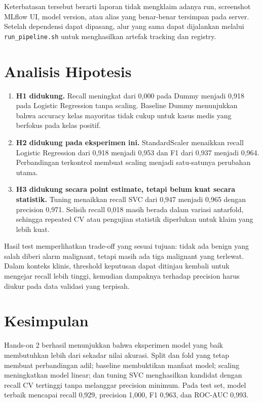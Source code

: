 \documentclass[11pt,a4paper]{article}
\begin{document}
Keterbatasan tersebut berarti laporan tidak mengklaim adanya run, screenshot MLflow UI, model version, atau alias yang benar-benar tersimpan pada server. Setelah dependensi dapat dipasang, alur yang sama dapat dijalankan melalui \texttt{run\_pipeline.sh} untuk menghasilkan artefak tracking dan registry.

\section{Analisis Hipotesis}

\begin{enumerate}
  \item \textbf{H1 didukung.} Recall meningkat dari 0,000 pada Dummy menjadi 0,918 pada Logistic Regression tanpa scaling. Baseline Dummy menunjukkan bahwa accuracy kelas mayoritas tidak cukup untuk kasus medis yang berfokus pada kelas positif.
  \item \textbf{H2 didukung pada eksperimen ini.} StandardScaler menaikkan recall Logistic Regression dari 0,918 menjadi 0,953 dan F1 dari 0,937 menjadi 0,964. Perbandingan terkontrol membuat scaling menjadi satu-satunya perubahan utama.
  \item \textbf{H3 didukung secara point estimate, tetapi belum kuat secara statistik.} Tuning menaikkan recall SVC dari 0,947 menjadi 0,965 dengan precision 0,971. Selisih recall 0,018 masih berada dalam variasi antarfold, sehingga repeated CV atau pengujian statistik diperlukan untuk klaim yang lebih kuat.
\end{enumerate}

Hasil test memperlihatkan trade-off yang sesuai tujuan: tidak ada benign yang salah diberi alarm malignant, tetapi masih ada tiga malignant yang terlewat. Dalam konteks klinis, threshold keputusan dapat ditinjau kembali untuk mengejar recall lebih tinggi, kemudian dampaknya terhadap precision harus diukur pada data validasi yang terpisah.

\section{Kesimpulan}

Hands-on 2 berhasil menunjukkan bahwa eksperimen model yang baik membutuhkan lebih dari sekadar nilai akurasi. Split dan fold yang tetap membuat perbandingan adil; baseline membuktikan manfaat model; scaling meningkatkan model linear; dan tuning SVC menghasilkan kandidat dengan recall CV tertinggi tanpa melanggar precision minimum. Pada test set, model terbaik mencapai recall 0,929, precision 1,000, F1 0,963, dan ROC-AUC 0,993.
\end{document}

